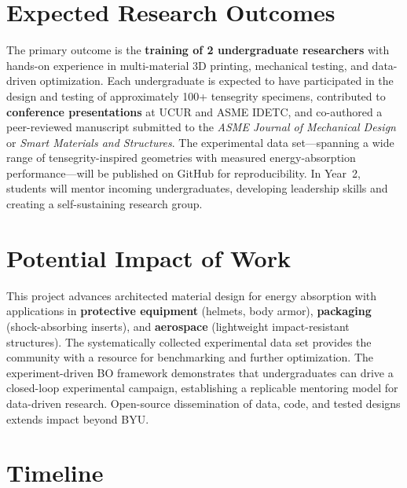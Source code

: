 \documentclass[11pt]{article}
\begin{document}
\section{Expected Research Outcomes}

The primary outcome is the \textbf{training of 2 undergraduate
researchers} with hands-on experience in multi-material 3D printing, mechanical
testing, and data-driven optimization. Each undergraduate is expected to have
participated in the design and testing of approximately 100+ tensegrity
specimens, contributed to \textbf{conference presentations} at UCUR
and ASME IDETC, and co-authored a peer-reviewed manuscript
submitted to the \emph{ASME Journal of Mechanical Design} or \emph{Smart
Materials and Structures}. The
experimental data set---spanning a wide range of tensegrity-inspired geometries
with measured energy-absorption performance---will be published on GitHub
for reproducibility.  In Year~2, students will
mentor incoming undergraduates, developing leadership skills and creating a
self-sustaining research group.

\section{Potential Impact of Work}

This project advances architected material design for energy absorption with
applications in \textbf{protective equipment} (helmets, body armor),
\textbf{packaging} (shock-absorbing inserts), and \textbf{aerospace}
(lightweight impact-resistant structures).  The systematically collected
experimental data set provides the community with a resource for benchmarking
and further optimization.  The experiment-driven BO framework
demonstrates that undergraduates can drive a closed-loop
experimental campaign, establishing a replicable mentoring model for
data-driven research.  Open-source dissemination of data, code, and tested designs extends
impact beyond BYU.

\section{Timeline}
\end{document}
